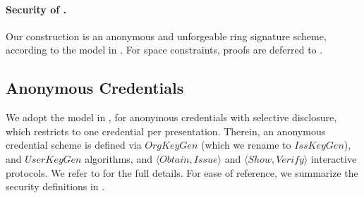 
\paragraph{Security of \CUASRing.} %
Our \CUASRing construction is an anonymous and unforgeable ring signature
scheme, according to the model in \cite{bkm06}. For space constraints,
proofs are deferred to .



\subsection{Anonymous Credentials}
\label{ssec:related-models-ac}

We adopt the model in \cite{fhs19}, for anonymous credentials with selective
disclosure, which restricts to one credential per presentation. Therein, an
anonymous credential scheme is defined via $OrgKeyGen$ (which we rename to
$IssKeyGen$), and $UserKeyGen$ algorithms, and $\langle Obtain,Issue\rangle$
and $\langle Show,Verify \rangle$ interactive protocols. We
refer to \cite{fhs19} for the full details. For ease of reference, we summarize
the security definitions in .%

